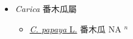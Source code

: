 
  \begin{itemize}
 \item[] \textit{Carica} 番木瓜屬
                    
  \begin{itemize}
        \item[] \href{http://www.theplantlist.org/tpl1.1/search?q=Carica+papaya}{\textit{C. papaya} L.}   番木瓜 NA $^n$
  \end{itemize}
  \end{itemize}

